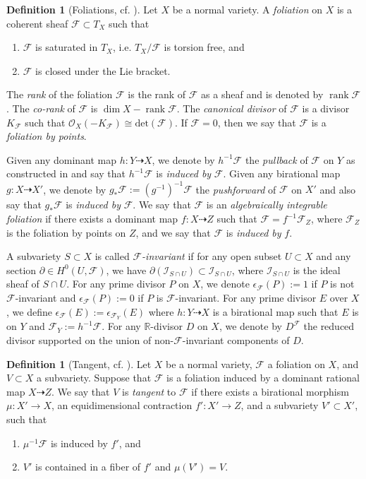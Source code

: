 \documentclass[11pt]{amsart}
\numberwithin{equation}{section}
\newcommand{\Rr}{\mathbb{R}}
\newcommand{\rk}{\operatorname{rank}}
\newcommand{\Ff}{\mathcal{F}}
\theoremstyle{definition}
\newtheorem{defn}[thm]{Definition}
\theoremstyle{definition}
\theoremstyle{definition}
\begin{document}
\begin{defn}[Foliations, {cf. \cite{ACSS21,CS21}}]\label{defn: foliation}
Let $X$ be a normal variety. A \emph{foliation} on $X$ is a coherent sheaf $\Ff\subset T_X$ such that
\begin{enumerate}
    \item $\Ff$ is saturated in $T_X$, i.e. $T_X/\Ff$ is torsion free, and
    \item $\Ff$ is closed under the Lie bracket.
\end{enumerate}
The \emph{rank} of the foliation $\Ff$ is the rank of $\Ff$ as a sheaf and is denoted by $\rk\Ff$. The \emph{co-rank} of $\Ff$ is $\dim X-\rk\Ff$. The \emph{canonical divisor} of $\Ff$ is a divisor $K_\Ff$ such that $\mathcal{O}_X(-K_{\mathcal{F}})\cong\mathrm{det}(\Ff)$. If $\Ff=0$, then we say that $\Ff$ is a \emph{foliation by points}.

Given any dominant map $h: Y\dashrightarrow X$, we denote by $h^{-1}\Ff$ the \emph{pullback} of $\Ff$ on $Y$ as constructed in \cite[3.2]{Dru21} and say that $h^{-1}\Ff$ is \emph{induced by} $\Ff$. Given any birational map $g: X\dashrightarrow X'$, we denote by $g_*\Ff:=(g^{-1})^{-1}\Ff$ the \emph{pushforward} of $\Ff$ on $X'$ and also say that $g_*\Ff$ is \emph{induced by} $\Ff$. We say that $\Ff$ is an \emph{algebraically integrable foliation} if there exists a dominant map $f: X\dashrightarrow Z$ such that $\Ff=f^{-1}\Ff_Z$, where $\Ff_Z$ is the foliation by points on $Z$, and we say that $\Ff$ is \emph{induced by} $f$.

A subvariety $S\subset X$ is called \emph{$\Ff$-invariant} if for any open subset $U\subset X$ and any section $\partial\in H^0(U,\Ff)$, we have $\partial(\mathcal{I}_{S\cap U})\subset \mathcal{I}_{S\cap U}$, 
where $\mathcal{I}_{S\cap U}$ is the ideal sheaf of $S\cap U$.  For any prime divisor $P$ on $X$, we denote $\epsilon_{\Ff}(P):=1$ if $P$ is not $\Ff$-invariant and $\epsilon_{\Ff}(P):=0$ if $P$ is $\Ff$-invariant. For any prime divisor $E$ over $X$, we define $\epsilon_{\Ff}(E):=\epsilon_{\Ff_Y}(E)$ where $h: Y\dashrightarrow X$ is a birational map such that $E$ is on $Y$ and $\Ff_Y:=h^{-1}\Ff$. For any $\Rr$-divisor $D$ on $X$, we denote by $D^{\Ff}$ the reduced divisor supported on the union of non-$\Ff$-invariant components of $D$.
\end{defn}

\begin{defn}[Tangent, {cf. \cite[Section 3.4]{ACSS21}}]\label{defn: tangent to foliation}
 Let $X$ be a normal variety, $\Ff$ a foliation on $X$, and $V\subset X$ a subvariety. Suppose that $\Ff$ is a foliation induced by a dominant rational map $X\dashrightarrow Z$. We say that $V$ is \emph{tangent} to $\Ff$ if there exists a birational morphism $\mu: X'\rightarrow X$, an equidimensional contraction $f': X'\rightarrow Z$, and a subvariety $V'\subset X'$, such that
    \begin{enumerate}
    \item $\mu^{-1}\Ff$ is induced by $f'$, and
        \item $V'$ is contained in a fiber of $f'$ and $\mu(V')=V$.
    \end{enumerate}
\end{defn}
\end{document}
